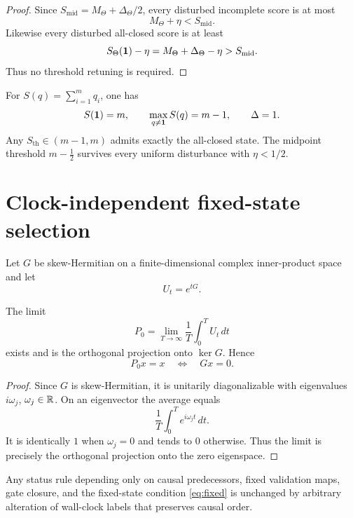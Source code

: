 \begin{proof}
Since $S_{\mathrm{mid}}=M_\Theta+\Delta_\Theta/2$, every disturbed incomplete score is at most
\[
M_\Theta+\eta<S_{\mathrm{mid}}.
\]
Likewise every disturbed all-closed score is at least
\[
S_\Theta(\mathbf 1)-\eta
=M_\Theta+\Delta_\Theta-\eta
>S_{\mathrm{mid}}.
\]
Thus no threshold retuning is required.
\end{proof}

\begin{example}
For $S(q)=\sum_{i=1}^m q_i$, one has
\[
S(\mathbf 1)=m,\qquad \max_{q\neq\mathbf 1}S(q)=m-1,\qquad \Delta=1.
\]
Any $S_{\mathrm{th}}\in(m-1,m)$ admits exactly the all-closed state. The midpoint threshold $m-\tfrac12$ survives every uniform disturbance with $\eta<1/2$.
\end{example}

\section{Clock-independent fixed-state selection}

Let $G$ be skew-Hermitian on a finite-dimensional complex inner-product space and let
\begin{equation}
U_t=e^{tG}.
\label{eq:flow}
\end{equation}

\begin{theorem}
The limit
\begin{equation}
P_0=\lim_{T\to\infty}\frac1T\int_0^T U_t\,dt
\label{eq:ergodic-average}
\end{equation}
exists and is the orthogonal projection onto $\ker G$. Hence
\begin{equation}
P_0x=x\quad\Longleftrightarrow\quad Gx=0.
\label{eq:fixed}
\end{equation}
\end{theorem}

\begin{proof}
Since $G$ is skew-Hermitian, it is unitarily diagonalizable with eigenvalues $i\omega_j$, $\omega_j\in\mathbb R$. On an eigenvector the average equals
\[
\frac1T\int_0^T e^{i\omega_jt}\,dt.
\]
It is identically $1$ when $\omega_j=0$ and tends to $0$ otherwise. Thus the limit is precisely the orthogonal projection onto the zero eigenspace.
\end{proof}

\begin{corollary}
Any status rule depending only on causal predecessors, fixed validation maps, gate closure, and the fixed-state condition \cref{eq:fixed} is unchanged by arbitrary alteration of wall-clock labels that preserves causal order.
\end{corollary}

